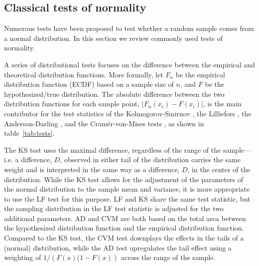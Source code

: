 \documentclass{article}\usepackage[]{graphicx}\usepackage[]{color}
\newcommand{\alnote}[1]{\todo[inline,color=green!40]{#1}}
\begin{document}

\subsection{Classical tests of normality}
Numerous tests have been proposed to test whether a random sample comes from a normal distribution. In this section we review commonly used tests of normality. 

A series of distributional tests focuses on the difference between the empirical and theoretical distribution functions. More formally, let $F_n$ be the empirical distribution function (ECDF) based on a sample size of $n$, and $F$ be the hypothesized/true distribution. The absolute difference between the two distribution functions for each sample point, $\left| F_n(x_i) - F(x_i) \right|$, is the main contributor for the test statistics of the Kolmogorov-Smirnov \cite[KS-test,][]{kolmogorov:1933, smirnov:1948}, the Lilliefors \cite[LF-test, ][]{lilliefors}, the Anderson-Darling \citep[AD-test,][]{adtest:1954}, and the Cram\'{e}r-von-Mises tests \citep[CVM-test,][]{cramer:1928, mises:1928}, as shown in table~\ref{tab:tests}.

The KS test uses the maximal  difference, 
regardless of the range of the sample---i.e. a difference, $D$, observed in either tail of the distribution carries the same weight and is interpreted in the same way as a difference, $D$, in the center of the distribution. While the KS test allows for the adjustment of the parameters of the normal distribution to the sample mean and variance, it is more appropriate to use the LF test for this purpose. LF and KS share the same test statistic, but the sampling distribution in the LF test statistic is adjusted for the two additional parameters.  AD and CVM  are both based on the total area between the hypothesized distribution function and the empirical distribution function. Compared to the KS  test,  the CVM test downplays the effects in the tails of a (normal) distribution, while the AD test upregulates the tail effect using a weighting of $1/\left(F(x)(1 - F(x)\right)$ across the range of the sample. 
\end{document}
